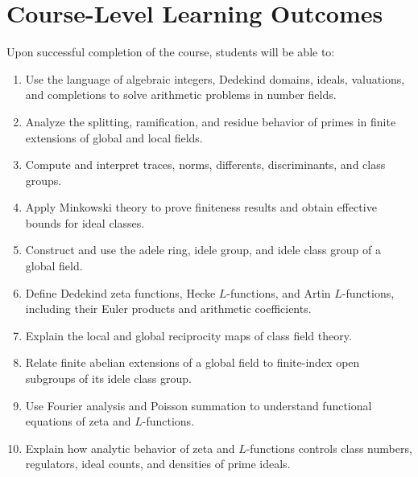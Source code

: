 \documentclass[11pt]{article}
\begin{document}
\section{Course-Level Learning Outcomes}

Upon successful completion of the course, students will be able to:

\begin{enumerate}
    \item Use the language of algebraic integers, Dedekind domains, ideals, valuations, and completions to solve arithmetic problems in number fields.

    \item Analyze the splitting, ramification, and residue behavior of primes in finite extensions of global and local fields.

    \item Compute and interpret traces, norms, differents, discriminants, and class groups.

    \item Apply Minkowski theory to prove finiteness results and obtain effective bounds for ideal classes.

    \item Construct and use the adele ring, idele group, and idele class group of a global field.

    \item Define Dedekind zeta functions, Hecke $L$-functions, and Artin $L$-functions, including their Euler products and arithmetic coefficients.

    \item Explain the local and global reciprocity maps of class field theory.

    \item Relate finite abelian extensions of a global field to finite-index open subgroups of its idele class group.

    \item Use Fourier analysis and Poisson summation to understand functional equations of zeta and $L$-functions.

    \item Explain how analytic behavior of zeta and $L$-functions controls class numbers, regulators, ideal counts, and densities of prime ideals.


\end{enumerate}
\end{document}
